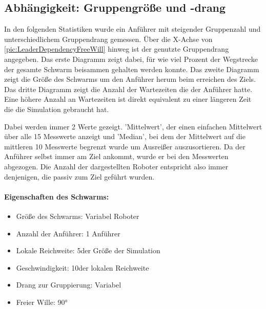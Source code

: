 %
%

\subsection*{Abhängigkeit: Gruppengröße und -drang}

In den folgenden Statistiken wurde ein Anführer mit steigender Gruppenzahl und unterschiedlichem Gruppendrang gemessen. Über die X-Achse von \autoref{pic:LeaderDependencyFreeWill} hinweg ist der genutzte Gruppendrang angegeben.
Das erste Diagramm zeigt dabei, für wie viel Prozent der Wegstrecke der gesamte Schwarm beisammen gehalten werden konnte.
Das zweite Diagramm zeigt die Größe des Schwarms um den Anführer herum beim erreichen des Ziels.
Das dritte Diagramm zeigt die Anzahl der Wartezeiten die der Anführer hatte. Eine höhere Anzahl an Wartezeiten ist direkt equivalent zu einer längeren Zeit die die Simulation gebraucht hat.

Dabei werden immer 2 Werte gezeigt. 'Mittelwert', der einen einfachen Mittelwert über alle 15 Messwerte anzeigt und 'Median', bei dem der Mittelwert auf die mittleren 10 Messwerte begrenzt wurde um Ausreißer auszusortieren. Da der Anführer selbst immer am Ziel ankommt, wurde er bei den Messwerten abgezogen. Die Anzahl der dargestellten Roboter entspricht also immer denjenigen, die passiv zum Ziel geführt wurden.

\paragraph*{Eigenschaften des Schwarms:}
\begin{itemize}
	\item Größe des Schwarms: Variabel Roboter
	\item Anzahl der Anführer: 1 Anführer
	\item Lokale Reichweite: 5\per der Größe der Simulation
	\item Geschwindigkeit: 10\per der lokalen Reichweite
	\item Drang zur Gruppierung: Variabel
	\item Freier Wille: 90°
\end{itemize}

